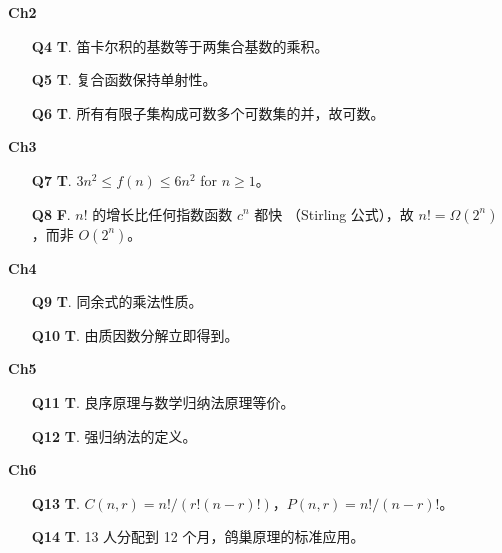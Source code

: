 \documentclass[11pt,a4paper,fontset=mac]{ctexart}
\begin{document}
\medskip
\noindent\textbf{Ch2}
\begin{enumerate}[leftmargin=*,label={\textbf{Q\arabic*}.},wide,itemsep=0pt,start=4]

\item[\textbf{Q4}] \textbf{T}.  笛卡尔积的基数等于两集合基数的乘积。

\item[\textbf{Q5}] \textbf{T}.  复合函数保持单射性。

\item[\textbf{Q6}] \textbf{T}.  所有有限子集构成可数多个可数集的并，故可数。

\end{enumerate}

\medskip
\noindent\textbf{Ch3}
\begin{enumerate}[leftmargin=*,label={\textbf{Q\arabic*}.},wide,itemsep=0pt,start=7]

\item[\textbf{Q7}] \textbf{T}.  $3n^{2}\le f(n)\le 6n^{2}$ for $n\ge1$。

\item[\textbf{Q8}] \textbf{F}.  $n!$ 的增长比任何指数函数 $c^{n}$ 都快
  （Stirling 公式），故 $n!=\Omega(2^{n})$，而非 $O(2^{n})$。

\end{enumerate}

\medskip
\noindent\textbf{Ch4}
\begin{enumerate}[leftmargin=*,label={\textbf{Q\arabic*}.},wide,itemsep=0pt,start=9]

\item[\textbf{Q9}] \textbf{T}.  同余式的乘法性质。

\item[\textbf{Q10}] \textbf{T}.  由质因数分解立即得到。

\end{enumerate}

\medskip
\noindent\textbf{Ch5}
\begin{enumerate}[leftmargin=*,label={\textbf{Q\arabic*}.},wide,itemsep=0pt,start=11]

\item[\textbf{Q11}] \textbf{T}.  良序原理与数学归纳法原理等价。

\item[\textbf{Q12}] \textbf{T}.  强归纳法的定义。

\end{enumerate}

\medskip
\noindent\textbf{Ch6}
\begin{enumerate}[leftmargin=*,label={\textbf{Q\arabic*}.},wide,itemsep=0pt,start=13]

\item[\textbf{Q13}] \textbf{T}.  $C(n,r)=n!/(r!(n-r)!)$，$P(n,r)=n!/(n-r)!$。

\item[\textbf{Q14}] \textbf{T}.  13 人分配到 12 个月，鸽巢原理的标准应用。

\end{enumerate}
\end{document}

